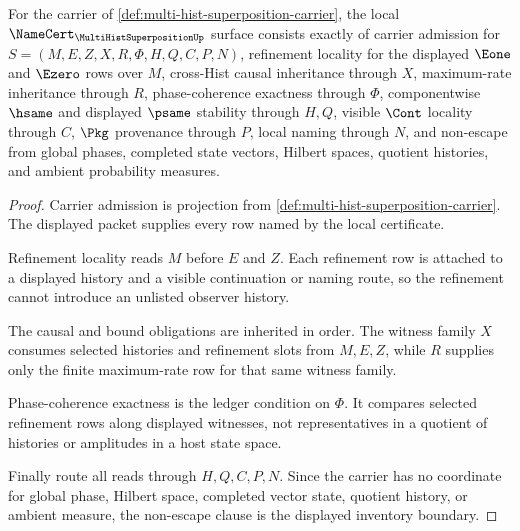 \begin{theorem}
\label{thm:multi-hist-superposition-namecert-obligations}
For the carrier of \autoref{def:multi-hist-superposition-carrier}, the local $\NameCert_{\MultiHistSuperpositionUp}$ surface consists exactly of carrier admission for $S=(M,E,Z,X,R,\Phi,H,Q,C,P,N)$, refinement locality for the displayed $\Eone$ and $\Ezero$ rows over $M$, cross-Hist causal inheritance through $X$, maximum-rate inheritance through $R$, phase-coherence exactness through $\Phi$, componentwise $\hsame$ and displayed $\psame$ stability through $H,Q$, visible $\Cont$ locality through $C$, $\Pkg$ provenance through $P$, local naming through $N$, and non-escape from global phases, completed state vectors, Hilbert spaces, quotient histories, and ambient probability measures.
\end{theorem}
\begin{proof}
Carrier admission is projection from \autoref{def:multi-hist-superposition-carrier}. The displayed packet supplies every row named by the local certificate.

Refinement locality reads $M$ before $E$ and $Z$. Each refinement row is attached to a displayed history and a visible continuation or naming route, so the refinement cannot introduce an unlisted observer history.

The causal and bound obligations are inherited in order. The witness family $X$ consumes selected histories and refinement slots from $M,E,Z$, while $R$ supplies only the finite maximum-rate row for that same witness family.

Phase-coherence exactness is the ledger condition on $\Phi$. It compares selected refinement rows along displayed witnesses, not representatives in a quotient of histories or amplitudes in a host state space.

Finally route all reads through $H,Q,C,P,N$. Since the carrier has no coordinate for global phase, Hilbert space, completed vector state, quotient history, or ambient measure, the non-escape clause is the displayed inventory boundary.
\end{proof}

